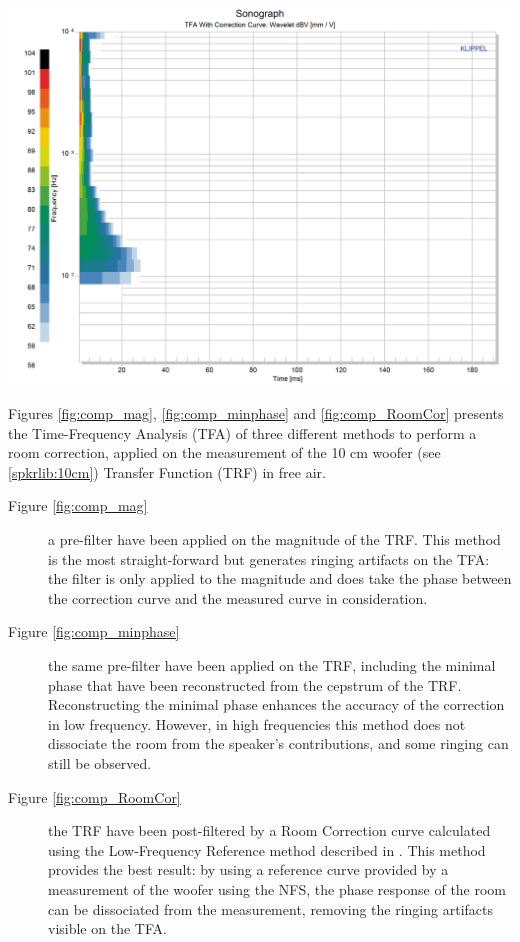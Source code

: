 \documentclass{report}
\begin{document}
\begin{minipage}{0.33333333\textwidth}
\begin{center}
	\includegraphics[width=\textwidth]{RoomComp/Sonograph_RoomCor} 
    \captionsetup{hypcap=false} 
	\label{fig:comp_RoomCor}
\end{center}
\end{minipage}
\vspace{0.1cm}

Figures \ref{fig:comp_mag}, \ref{fig:comp_minphase} and \ref{fig:comp_RoomCor} presents the Time-Frequency Analysis (TFA) of three different methods to perform a room correction, applied on the measurement of the 10 cm woofer (see \ref{spkrlib:10cm}) Transfer Function (TRF) in free air.
\begin{description}
\item[Figure \ref{fig:comp_mag}] a pre-filter have been applied on the magnitude of the TRF. This method is the most straight-forward but generates ringing artifacts on the TFA: the filter is only applied to the magnitude and does take the phase between the correction curve and the measured curve in consideration. 
\item[Figure \ref{fig:comp_minphase}] the same pre-filter have been applied on the TRF, including the minimal phase that have been reconstructed from the cepstrum of the TRF. Reconstructing the minimal phase enhances the accuracy of the correction in low frequency. However, in high frequencies this method does not dissociate the room from the speaker's contributions, and some ringing can still be observed.
\item[Figure \ref{fig:comp_RoomCor}] the TRF have been post-filtered by a Room Correction curve calculated using the Low-Frequency Reference method described in \citep[][sect.~4]{aeswb}. This method provides the best result: by using a reference curve provided by a measurement of the woofer using the NFS, the phase response of the room can be dissociated from the measurement, removing the ringing artifacts visible on the TFA. 
\end{description}
\end{document}
